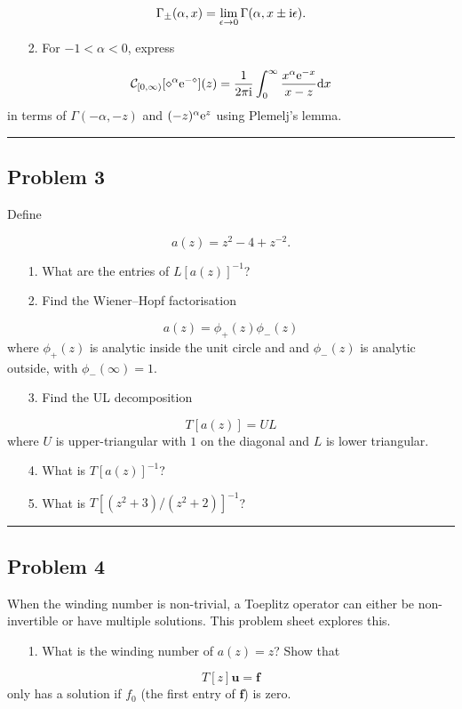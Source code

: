 \documentclass[12pt,a4paper]{article}
\def\D{ {\rm d} }
\def\I{ {\rm i} }
\def\E{ {\rm e} }
\def\CC{ {\cal C} }
\def\vc#1{ {\mathbf #1} }
\def\dx{\D x}
\def\endash{–}
\begin{document}
\[
\Gamma_\pm(\alpha,x)= \lim_{\epsilon \rightarrow0} \Gamma(\alpha, x\pm \I \epsilon).
\]
\begin{itemize}
\item[2. ] For $-1 < \alpha < 0$, express

\end{itemize}
\[
	\CC_{[0,\infty)}[\diamond^\alpha \E^{-\diamond}](z) = {1 \over 2 \pi \I} \int_0^\infty {x^\alpha \E^{-x} \over x-z} \dx
\]
in terms of	  $\Gamma(-\alpha,-z)$ and $(-z)^{\alpha} \E^z$ using Plemelj's lemma.

\rule{\textwidth}{1pt}
\subsection{Problem 3}
Define

\[
a(z) = z^2 - 4 + z^{-2}.
\]
\begin{itemize}
\item[1. ] What are the entries of $L[a(z)]^{-1}$?


\item[2. ] Find the Wiener\ensuremath{\endash}Hopf factorisation

\end{itemize}
\[
a(z) = \phi_+(z) \phi_-(z)
\]
where $\phi_+(z)$ is analytic inside the unit circle and and $\phi_-(z)$ is analytic outside, with $\phi_-(\infty) = 1$.

\begin{itemize}
\item[3. ] Find the UL decomposition

\end{itemize}
\[
T[a(z)] = U L
\]
where $U$ is upper-triangular with $1$ on the diagonal and $L$ is lower triangular.

\begin{itemize}
\item[4. ] What is $T[a(z)]^{-1}$?


\item[5. ] What is $T[(z^2+3)/(z^2+2)]^{-1}$?

\end{itemize}
\rule{\textwidth}{1pt}
\subsection{Problem 4}
When the winding number is non-trivial, a Toeplitz operator can either be non-invertible or have multiple solutions. This problem sheet explores this.

\begin{itemize}
\item[1. ] What is the winding number of $a(z) = z$? Show that

\end{itemize}
\[
T[z] \vc u = \vc f
\]
only has a solution if $f_0$ (the first entry of $\vc f$) is zero.
\end{document}
